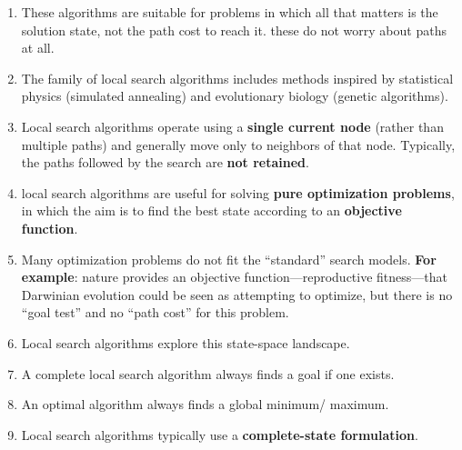 \begin{enumerate}
    \item These algorithms are suitable for problems in which all that matters is the solution state, not the path cost to reach it.
    these do not worry about paths at all.
    \hfill \cite{ai/book/Artificial-Intelligence-A-Modern-Approach/Russell-Norvig}

    \item The family of local search algorithms includes methods inspired by statistical physics (simulated annealing) and evolutionary biology (genetic algorithms).
    \hfill \cite{ai/book/Artificial-Intelligence-A-Modern-Approach/Russell-Norvig}

    \item Local search algorithms operate using a \textbf{single current node} (rather than multiple paths) and generally move only to neighbors of that node.
    Typically, the paths followed by the search are \textbf{not retained}.
    \hfill \cite{ai/book/Artificial-Intelligence-A-Modern-Approach/Russell-Norvig}

    \item local search algorithms are useful for solving \textbf{pure optimization problems}, in which the aim is to find the best state according to an \textbf{objective function}.
    \hfill \cite{ai/book/Artificial-Intelligence-A-Modern-Approach/Russell-Norvig}

    \item Many optimization problems do not fit the “standard” search models. 
    \textbf{For example}: nature provides an objective function—reproductive fitness—that Darwinian evolution could be seen as attempting to optimize, but there is no “goal test” and no “path cost” for this problem.
    \hfill \cite{ai/book/Artificial-Intelligence-A-Modern-Approach/Russell-Norvig}

    \item  Local search algorithms explore this state-space landscape. 
    \hfill \cite{ai/book/Artificial-Intelligence-A-Modern-Approach/Russell-Norvig}

    \item A complete local search algorithm always finds a goal if one exists.
    \hfill \cite{ai/book/Artificial-Intelligence-A-Modern-Approach/Russell-Norvig}
    
    \item An optimal algorithm always finds a global minimum/ maximum.
    \hfill \cite{ai/book/Artificial-Intelligence-A-Modern-Approach/Russell-Norvig}

    \item Local search algorithms typically use a \textbf{complete-state formulation}.
    \hfill  \cite{ai/book/Artificial-Intelligence-A-Modern-Approach/Russell-Norvig}


\end{enumerate}

